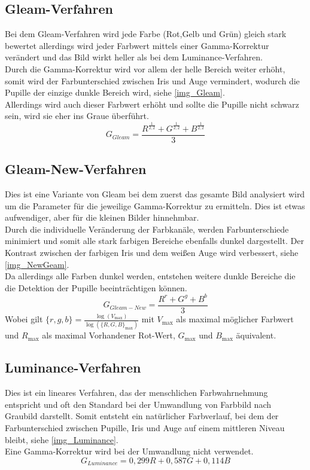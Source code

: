 \subsection{Gleam-Verfahren}
\label{gray_Gleam}
Bei dem Gleam-Verfahren wird jede Farbe (Rot,Gelb und Grün) gleich stark bewertet allerdings wird jeder Farbwert mittels einer Gamma-Korrektur verändert und das Bild wirkt heller als bei dem Luminance-Verfahren.\\
Durch die Gamma-Korrektur wird vor allem der helle Bereich weiter erhöht, somit wird der Farbunterschied zwischen Iris und Auge vermindert, wodurch die Pupille der einzige dunkle Bereich wird, siehe \autoref{img_Gleam}.\\
Allerdings wird auch dieser Farbwert erhöht und sollte die Pupille nicht schwarz sein, wird sie eher ins Graue überführt.\cite{rgb_to_Gray}\\
\[G_{Gleam}=\dfrac{R^{\frac{1}{2,2}} + G^{\frac{1}{2,2}} + B^{\frac{1}{2,2}}}{3}\]
\subsection{Gleam-New-Verfahren}
\label{gray_New}
Dies ist eine Variante von Gleam bei dem zuerst das gesamte Bild analysiert wird um die Parameter für die jeweilige Gamma-Korrektur zu ermitteln. Dies ist etwas aufwendiger, aber für die kleinen Bilder hinnehmbar.\\
Durch die individuelle Veränderung der Farbkanäle, werden Farbunterschiede minimiert und somit alle stark farbigen Bereiche ebenfalls dunkel dargestellt. Der Kontrast zwischen der farbigen Iris und dem weißen Auge wird verbessert, siehe \autoref{img_NewGeam}.\\
Da allerdings alle Farben dunkel werden, entstehen weitere dunkle Bereiche die die Detektion der Pupille beeinträchtigen können.
\[G_{Gleam-New}=\dfrac{R^{r} + G^{g} + B^{b}}{3}\]
Wobei gilt $\{r,g,b\} = \frac{\log(V_{\max})}{\log(\{R,G,B\}_{\max})}$ mit $V_{\max}$ als maximal möglicher Farbwert und $R_{\max}$ als maximal Vorhandener Rot-Wert, $G_{\max}$ und $B_{\max}$ äquivalent.
\subsection{Luminance-Verfahren}
\label{gray_Luminance}
Dies ist ein lineares Verfahren, das der menschlichen Farbwahrnehmung entspricht und oft den Standard bei der Umwandlung von Farbbild nach Graubild darstellt. Somit entsteht ein natürlicher Farbverlauf, bei dem der Farbunterschied zwischen Pupille, Iris und Auge auf einem mittleren Niveau bleibt, siehe \autoref{img_Luminance}.\\
Eine Gamma-Korrektur wird bei der Umwandlung nicht verwendet.\cite{rgb_to_Gray}
\[G_{Luminance} = 0,299 R + 0,587 G + 0,114 B\]

